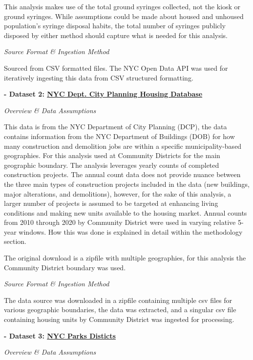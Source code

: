 \documentclass[
]{article}
\begin{document}
This analysis makes use of the total ground syringes collected, not the
kiosk or ground syringes. While assumptions could be made about housed
and unhoused population's syringe disposal habits, the total number of
syringes publicly disposed by either method should capture what is
needed for this analysis.

\emph{Source Format \& Ingestion Method}

Sourced from CSV formatted files. The NYC Open Data API was used for
iteratively ingesting this data from CSV structured formatting.

\textbf{- Dataset 2:
\href{https://data.cityofnewyork.us/Housing-Development/Housing-Database/6umk-irkx/about_data}{NYC
Dept. City Planning Housing Database}}

\emph{Overview \& Data Assumptions}

This data is from the NYC Department of City Planning (DCP), the data
contains information from the NYC Department of Buildings (DOB) for how
many construction and demolition jobs are within a specific
municipality-based geographies. For this analysis used at Community
Districts for the main geographic boundary. The analysis leverages
yearly counts of completed construction projects. The annual count data
does not provide nuance between the three main types of construction
projects included in the data (new buildings, major alterations, and
demolitions), however, for the sake of this analysis, a larger number of
projects is assumed to be targeted at enhancing living conditions and
making new units available to the housing market. Annual counts from
2010 through 2020 by Community District were used in varying relative
5-year windows. How this was done is explained in detail within the
methodology section.

The original download is a zipfile with multiple geographies, for this
analysis the Community District boundary was used.

\emph{Source Format \& Ingestion Method}

The data source was downloaded in a zipfile containing multiple csv
files for various geographic boundaries, the data was extracted, and a
singular csv file containing housing units by Community District was
ingested for processing.

\textbf{- Dataset 3:
\href{https://data.cityofnewyork.us/City-Government/NYC-Parks-Districts/mebz-ditc/about_data}{NYC
Parks Disticts}}

\emph{Overview \& Data Assumptions}
\end{document}
